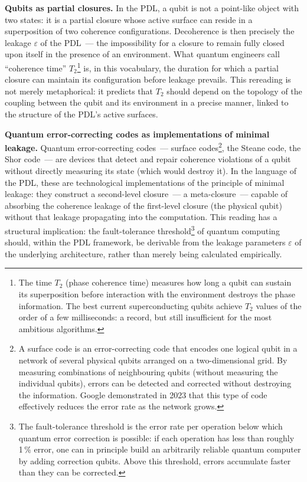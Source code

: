 \documentclass[12pt, a4paper, openright]{book}
\begin{document}
\medskip

\textbf{Qubits as partial closures.} In the PDL, a qubit is not a point-like object with two states: it is a partial closure whose active surface can reside in a superposition of two coherence configurations. Decoherence is then precisely the leakage $\varepsilon$ of the PDL~--- the impossibility for a closure to remain fully closed upon itself in the presence of an environment. What quantum engineers call ``coherence time'' $T_2$\footnote{The time $T_2$ (phase coherence time) measures how long a qubit can sustain its superposition before interaction with the environment destroys the phase information. The best current superconducting qubits achieve $T_2$ values of the order of a few milliseconds: a record, but still insufficient for the most ambitious algorithms.} is, in this vocabulary, the duration for which a partial closure can maintain its configuration before leakage prevails. This rereading is not merely metaphorical: it predicts that $T_2$ should depend on the topology of the coupling between the qubit and its environment in a precise manner, linked to the structure of the PDL's active surfaces.

\medskip

\textbf{Quantum error-correcting codes as implementations of minimal leakage.} Quantum error-correcting codes~--- surface codes\footnote{A surface code is an error-correcting code that encodes one logical qubit in a network of several physical qubits arranged on a two-dimensional grid. By measuring combinations of neighbouring qubits (without measuring the individual qubits), errors can be detected and corrected without destroying the information. Google demonstrated in 2023 that this type of code effectively reduces the error rate as the network grows.}, the Steane code, the Shor code~--- are devices that detect and repair coherence violations of a qubit without directly measuring its state (which would destroy it). In the language of the PDL, these are technological implementations of the principle of minimal leakage: they construct a second-level closure~--- a meta-closure~--- capable of absorbing the coherence leakage of the first-level closure (the physical qubit) without that leakage propagating into the computation. This reading has a structural implication: the fault-tolerance threshold\footnote{The fault-tolerance threshold is the error rate per operation below which quantum error correction is possible: if each operation has less than roughly 1\,\% error, one can in principle build an arbitrarily reliable quantum computer by adding correction qubits. Above this threshold, errors accumulate faster than they can be corrected.} of quantum computing should, within the PDL framework, be derivable from the leakage parameters $\varepsilon$ of the underlying architecture, rather than merely being calculated empirically.
\end{document}
